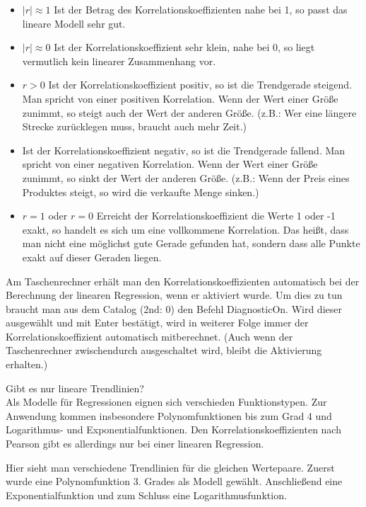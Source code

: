 \hfill \break
\begin{itemize}
    \item $|r|\approx 1$ Ist der Betrag des Korrelationskoeffizienten nahe bei 1, so passt das lineare Modell sehr gut.
    \item $|r|\approx 0$ Ist der Korrelationskoeffizient sehr klein, nahe bei 0, so liegt vermutlich kein linearer Zusammenhang vor.
    \item $r > 0$ Ist der Korrelationskoeffizient positiv, so ist die Trendgerade steigend. Man spricht von einer positiven Korrelation.
    Wenn der Wert einer Größe zunimmt, so steigt auch der Wert der anderen Größe. (z.B.: Wer eine längere Strecke zurücklegen muss, braucht auch mehr Zeit.)
    \item Ist der Korrelationskoeffizient negativ, so ist die Trendgerade fallend. Man spricht von einer negativen Korrelation.
    Wenn der Wert einer Größe zunimmt, so sinkt der Wert der anderen Größe. (z.B.: Wenn der Preis eines Produktes steigt, so wird die verkaufte Menge sinken.)
    \item $r = 1$ oder $r=0$ Erreicht der Korrelationskoeffizient die Werte 1 oder -1 exakt, so handelt es sich um eine vollkommene Korrelation.
    Das heißt, dass man nicht eine möglichst gute Gerade gefunden hat, sondern dass alle Punkte exakt auf dieser Geraden liegen.
\end{itemize}

\hfill \break
Am Taschenrechner erhält man den Korrelationskoeffizienten automatisch bei der Berechnung der linearen Regression, wenn er aktiviert wurde.
Um dies zu tun braucht man aus dem Catalog (2nd: 0) den Befehl DiagnosticOn.
Wird dieser ausgewählt und mit Enter bestätigt, wird in weiterer Folge immer der Korrelationskoeffizient automatisch mitberechnet.
(Auch wenn der Taschenrechner zwischendurch ausgeschaltet wird, bleibt die Aktivierung erhalten.)


\newpage
\hfill \break
Gibt es nur lineare Trendlinien?\\
Als Modelle für Regressionen eignen sich verschieden Funktionstypen.
Zur Anwendung kommen insbesondere Polynomfunktionen bis zum Grad 4 und Logarithmus- und Exponentialfunktionen.
Den Korrelationskoeffizienten nach Pearson gibt es allerdings nur bei einer linearen Regression.

\hfill \break
Hier sieht man verschiedene Trendlinien für die gleichen Wertepaare.
Zuerst wurde eine Polynomfunktion 3. Grades als Modell gewählt.
Anschließend eine Exponentialfunktion und zum Schluss eine Logarithmusfunktion.